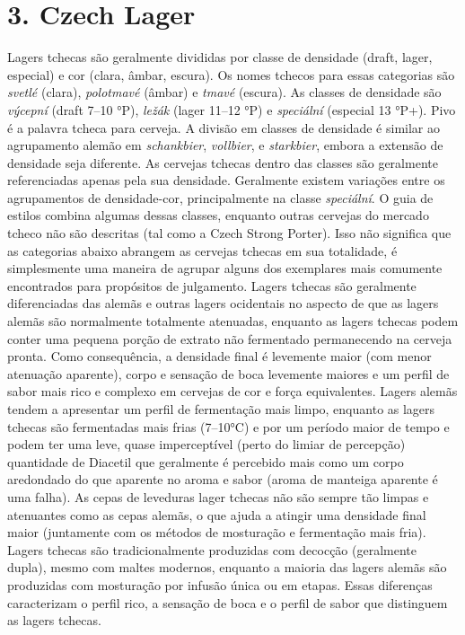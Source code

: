 \section*{3. Czech Lager}

Lagers tchecas são geralmente divididas por classe de densidade (draft, lager, especial) e cor (clara, âmbar, escura). Os nomes tchecos para essas categorias são \textit{svetlé} (clara), \textit{polotmavé} (âmbar) e \textit{tmavé} (escura). As classes de densidade são \textit{výcepní} (draft 7–10 °P), \textit{ležák} (lager 11–12 °P) e \textit{speciální} (especial 13 °P+). Pivo é a palavra tcheca para cerveja. A divisão em classes de densidade é similar ao agrupamento alemão em \textit{schankbier}, \textit{vollbier}, e \textit{starkbier}, embora a extensão de densidade seja diferente. As cervejas tchecas dentro das classes são geralmente referenciadas apenas pela sua densidade. Geralmente existem variações entre os agrupamentos de densidade-cor, principalmente na classe \textit{speciální}. O guia de estilos combina algumas dessas classes, enquanto outras cervejas do mercado tcheco não são descritas (tal como a Czech Strong Porter). Isso não significa que as categorias abaixo abrangem as cervejas tchecas em sua totalidade, é simplesmente uma maneira de agrupar alguns dos exemplares mais comumente encontrados para propósitos de julgamento. Lagers tchecas são geralmente diferenciadas das alemãs e outras lagers ocidentais no aspecto de que as lagers alemãs são normalmente totalmente atenuadas, enquanto as lagers tchecas podem conter uma pequena porção de extrato não fermentado permanecendo na cerveja pronta. Como consequência, a densidade final é levemente maior (com menor atenuação aparente), corpo e sensação de boca levemente maiores e um perfil de sabor mais rico e complexo em cervejas de cor e força equivalentes. Lagers alemãs tendem a apresentar um perfil de fermentação mais limpo, enquanto as lagers tchecas são fermentadas mais frias (7–10°C) e por um período maior de tempo e podem ter uma leve, quase imperceptível (perto do limiar de percepção) quantidade de Diacetil que geralmente é percebido mais como um corpo aredondado do que aparente no aroma e sabor (aroma de manteiga aparente é uma falha). As cepas de leveduras lager tchecas não são sempre tão limpas e atenuantes como as cepas alemãs, o que ajuda a atingir uma densidade final maior (juntamente com os métodos de mosturação e fermentação mais fria). Lagers tchecas são tradicionalmente produzidas com decocção (geralmente dupla), mesmo com maltes modernos, enquanto a maioria das lagers alemãs são produzidas com mosturação por infusão única ou em etapas. Essas diferenças caracterizam o perfil rico, a sensação de boca e o perfil de sabor que distinguem as lagers tchecas.
